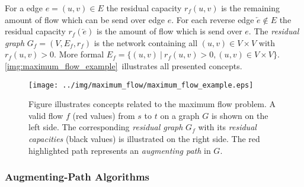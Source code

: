 For a edge $e = (u,v) \in E$ the residual capacity $r_f(u,v)$ is the remaining amount of 
flow which can be send over edge $e$. For each reverse edge $\overleftarrow{e} \notin E$ the
residual capacity $r_f(\overleftarrow{e})$ is the amount of flow which is send over $e$.
The \emph{residual graph} $G_f = (V,E_f,r_f)$ is the network containing all $(u,v) \in V \times V$
with $r_f(u,v) > 0$. More formal $E_f = \{(u,v)\ |\ r_f(u,v) > 0, (u,v) \in V \times V\}$.
\autoref{img:maximum_flow_example}~illustrates all presented concepts.

\begin{figure}
\centering
\texttt{[image: ../img/maximum\_flow/maximum\_flow\_example.eps]}
\caption{Figure illustrates concepts related to the maximum flow problem. A valid flow $f$ 
(red values) from $s$ to $t$ on a graph $G$ is shown on the left side. The corresponding
\emph{residual graph} $G_f$ with its \emph{residual capacities} (black values) 
is illustrated on the right side. The red highlighted path represents an \emph{augmenting path}
in $G$.}
\label{img:maximum_flow_example}
\end{figure}


\subsubsection{Augmenting-Path Algorithms}
\label{sec:aug_path}

